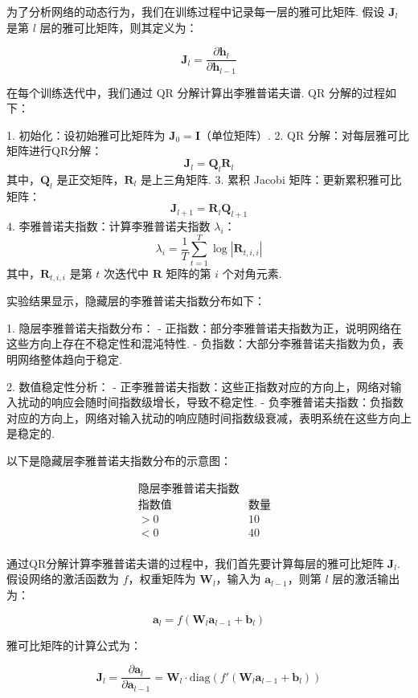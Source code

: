 为了分析网络的动态行为，我们在训练过程中记录每一层的雅可比矩阵. 假设 \(\mathbf{J}_l\) 是第 \(l\) 层的雅可比矩阵，则其定义为：

\[
\mathbf{J}_l = \frac{\partial \mathbf{h}_l}{\partial \mathbf{h}_{l-1}}
\]

在每个训练迭代中，我们通过 QR 分解计算出李雅普诺夫谱. QR 分解的过程如下：

1. 初始化：设初始雅可比矩阵为 \(\mathbf{J}_0 = \mathbf{I}\)（单位矩阵）. 
2. QR 分解：对每层雅可比矩阵进行QR分解：
   \[
   \mathbf{J}_l = \mathbf{Q}_l \mathbf{R}_l
   \]
   其中，\(\mathbf{Q}_l\) 是正交矩阵，\(\mathbf{R}_l\) 是上三角矩阵. 
3. 累积 Jacobi 矩阵：更新累积雅可比矩阵：
   \[
   \mathbf{J}_{l+1} = \mathbf{R}_l \mathbf{Q}_{l+1}
   \]
4. 李雅普诺夫指数：计算李雅普诺夫指数 \(\lambda_i\)：
   \[
   \lambda_i = \frac{1}{T} \sum_{t=1}^T \log |\mathbf{R}_{t,i,i}|
   \]
   其中，\(\mathbf{R}_{t,i,i}\) 是第 \(t\) 次迭代中 \(\mathbf{R}\) 矩阵的第 \(i\) 个对角元素. 

实验结果显示，隐藏层的李雅普诺夫指数分布如下：



1. 隐层李雅普诺夫指数分布：
   - 正指数：部分李雅普诺夫指数为正，说明网络在这些方向上存在不稳定性和混沌特性. 
   - 负指数：大部分李雅普诺夫指数为负，表明网络整体趋向于稳定. 

2. 数值稳定性分析：
   - 正李雅普诺夫指数：这些正指数对应的方向上，网络对输入扰动的响应会随时间指数级增长，导致不稳定性. 
   - 负李雅普诺夫指数：负指数对应的方向上，网络对输入扰动的响应随时间指数级衰减，表明系统在这些方向上是稳定的. 

以下是隐藏层李雅普诺夫指数分布的示意图：

\[
\begin{array}{ccc}
\text{隐层李雅普诺夫指数} & & \\
\hline
\text{指数值} & \text{数量} \\
\hline
>0 & 10 \\
<0 & 40 \\
\end{array}
\]

通过QR分解计算李雅普诺夫谱的过程中，我们首先要计算每层的雅可比矩阵 \(\mathbf{J}_l\). 假设网络的激活函数为 \( f \)，权重矩阵为 \(\mathbf{W}_l\)，输入为 \(\mathbf{a}_{l-1}\)，则第 \(l\) 层的激活输出为：

\[
\mathbf{a}_l = f(\mathbf{W}_l \mathbf{a}_{l-1} + \mathbf{b}_l)
\]

雅可比矩阵的计算公式为：

\[
\mathbf{J}_l = \frac{\partial \mathbf{a}_l}{\partial \mathbf{a}_{l-1}} = \mathbf{W}_l \cdot \text{diag}(f'(\mathbf{W}_l \mathbf{a}_{l-1} + \mathbf{b}_l))
\]

